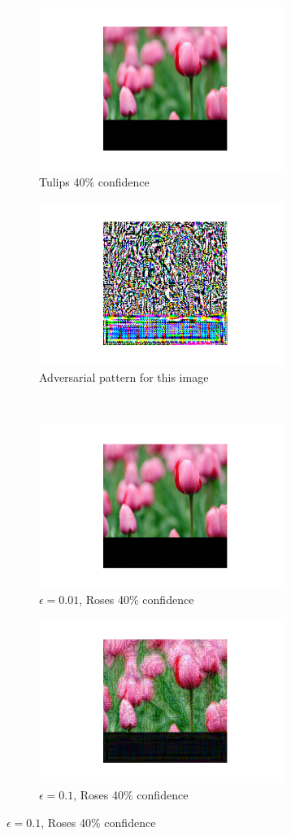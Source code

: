\begin{figure}[h]
    \begin{subfigure}{0.4\textwidth}
        \caption{Tulips 40\% confidence}
        \includegraphics[width=8cm]{images/og_image}
    \end{subfigure}
    \begin{subfigure}{0.4\textwidth}
        \caption{Adversarial pattern for this image}
        \includegraphics[width=8cm]{images/adv_pattern}
    \end{subfigure}
    \\
    \begin{subfigure}{0.4\textwidth}
        \caption{$\epsilon = 0.01$, Roses 40\% confidence}
        \includegraphics[width=8cm]{images/adv_attack_001}
    \end{subfigure}
    \begin{subfigure}{0.4\textwidth}
        \caption{$\epsilon = 0.1$, Roses 40\% confidence}
        \includegraphics[width=8cm]{images/adv_attack_01}
    \end{subfigure}
\end{figure}

